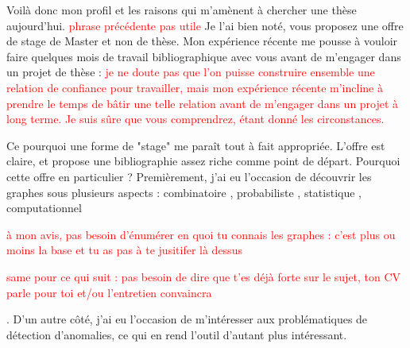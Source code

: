 \documentclass[a4paper,11pt]{article}
\begin{document}
Voilà donc mon profil et les raisons qui m'amènent à chercher une thèse aujourd'hui. \textcolor{red}{phrase précédente pas utile} Je l'ai bien noté, vous proposez une offre de stage de Master et non de thèse. Mon expérience récente me pousse à vouloir faire quelques mois de travail bibliographique avec vous avant de m'engager dans un projet de thèse : \textcolor{red}{je ne doute pas que l'on puisse construire ensemble une relation de confiance pour travailler, mais mon expérience récente m'incline à prendre le temps de bâtir une telle relation avant de m'engager dans un projet à long terme. Je suis sûre que vous comprendrez, étant donné les circonstances.}


Ce pourquoi une forme de "stage" me paraît tout à fait appropriée.  L'offre est claire, et propose une bibliographie assez riche comme point de départ. 
%
Pourquoi cette offre en particulier ? Premièrement, j'ai eu l'occasion de découvrir les graphes sous plusieurs aspects : combinatoire
, probabiliste
, statistique %
, computationnel 

\textcolor{red}{à mon avis, pas besoin d'énumérer en quoi tu connais les graphes : c'est plus ou moins la base et tu as pas à te jusitifer là dessus}

\textcolor{red}{same pour ce qui suit : pas besoin de dire que t'es déjà forte sur le sujet, ton CV parle pour toi et/ou l'entretien convaincra}

. D'un autre côté, j'ai eu l'occasion de m'intéresser aux problématiques de détection d'anomalies, %
ce qui en rend l'outil d'autant plus intéressant. 

%
\end{document}
